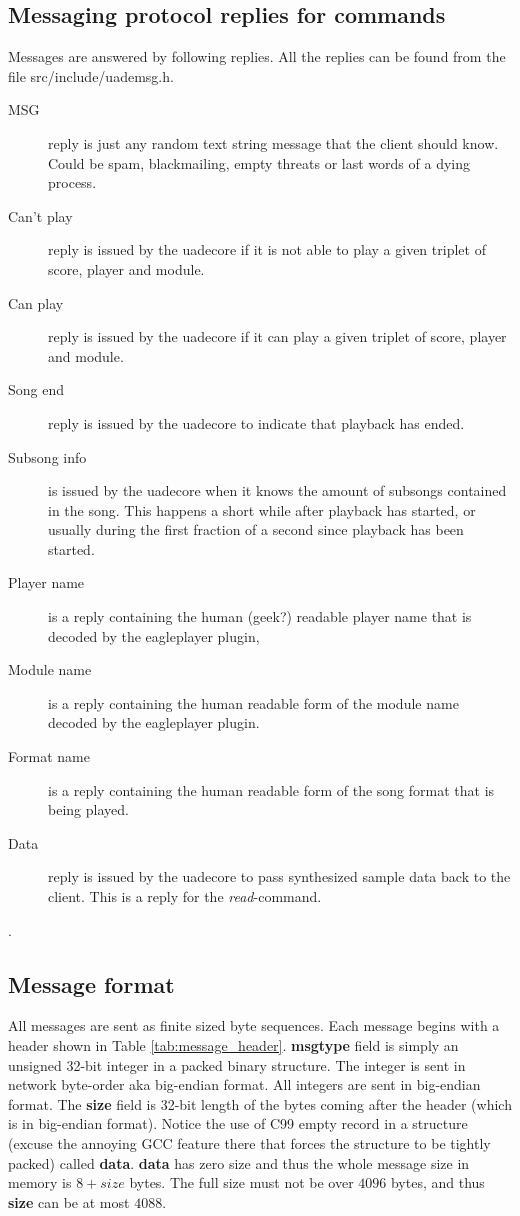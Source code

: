 \documentclass{article}
\begin{document}
\subsection{Messaging protocol replies for commands}

Messages are answered by following replies.
All the replies can be found from the file \mbox{src/include/uademsg.h}.

\begin{description}
\item [MSG] reply is just any random text string message that the client should
know. Could be spam, blackmailing, empty threats or last words of a dying
process.
\item [Can't play] reply is issued by the uadecore if it is not able to play
a given triplet of score, player and module.
\item [Can play] reply is issued by the uadecore if it can play a given
triplet of score, player and module.
\item [Song end] reply is issued by the uadecore to indicate that playback
has ended.
\item [Subsong info] is issued by the uadecore when it knows the amount of
subsongs contained in the song. This happens a short while after playback
has started, or usually during the first fraction of a second since
playback has been started.
\item [Player name] is a reply containing the human (geek?) readable player
name that is decoded by the eagleplayer plugin,
\item [Module name] is a reply containing the human readable form of the
module name decoded by the eagleplayer plugin.
\item [Format name] is a reply containing the human readable form
of the song format that is being played.
\item [Data] reply is issued by the uadecore to pass synthesized sample
data back to the client. This is a reply for the \emph{read}-command.
\end{description}.

\subsection{Message format}
All messages are sent as finite sized byte sequences. Each message begins
with a header shown in Table \ref{tab:message_header}.
\textbf{msgtype} field is simply an unsigned 32-bit integer in a packed
binary structure. The integer is sent in network byte-order aka big-endian
format. All integers are sent in big-endian format.
The \textbf{size} field is 32-bit length of the bytes coming after the header
(which is in big-endian format).
Notice the use of C99 empty record in a structure (excuse the annoying GCC
feature there that forces the structure to be tightly packed) called
\textbf{data}. \textbf{data} has zero
size and thus the whole message size in memory is $8 + size$ bytes. The
full size must not be over $4096$ bytes, and thus \textbf{size} can be
at most $4088$.
\end{document}
